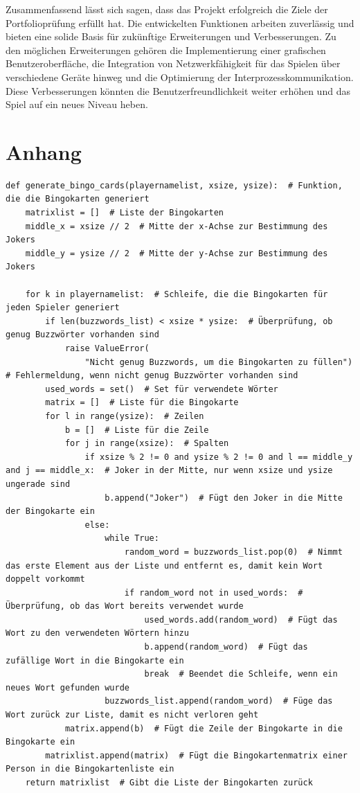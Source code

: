\documentclass{llncs}
\begin{document}
Zusammenfassend lässt sich sagen, dass das Projekt erfolgreich die Ziele der Portfolioprüfung erfüllt hat. Die entwickelten Funktionen arbeiten zuverlässig und bieten eine solide Basis für zukünftige Erweiterungen und Verbesserungen. Zu den möglichen Erweiterungen gehören die Implementierung einer grafischen Benutzeroberfläche, die Integration von Netzwerkfähigkeit für das Spielen über verschiedene Geräte hinweg und die Optimierung der Interprozesskommunikation. Diese Verbesserungen könnten die Benutzerfreundlichkeit weiter erhöhen und das Spiel auf ein neues Niveau heben.

\section{Anhang}

\begin{lstlisting}[caption=Generierung der Bingokarten]
    def generate_bingo_cards(playernamelist, xsize, ysize):  # Funktion, die die Bingokarten generiert
    matrixlist = []  # Liste der Bingokarten
    middle_x = xsize // 2  # Mitte der x-Achse zur Bestimmung des Jokers
    middle_y = ysize // 2  # Mitte der y-Achse zur Bestimmung des Jokers

    for k in playernamelist:  # Schleife, die die Bingokarten für jeden Spieler generiert
        if len(buzzwords_list) < xsize * ysize:  # Überprüfung, ob genug Buzzwörter vorhanden sind
            raise ValueError(
                "Nicht genug Buzzwords, um die Bingokarten zu füllen")  # Fehlermeldung, wenn nicht genug Buzzwörter vorhanden sind
        used_words = set()  # Set für verwendete Wörter
        matrix = []  # Liste für die Bingokarte
        for l in range(ysize):  # Zeilen
            b = []  # Liste für die Zeile
            for j in range(xsize):  # Spalten
                if xsize % 2 != 0 and ysize % 2 != 0 and l == middle_y and j == middle_x:  # Joker in der Mitte, nur wenn xsize und ysize ungerade sind
                    b.append("Joker")  # Fügt den Joker in die Mitte der Bingokarte ein
                else:
                    while True:
                        random_word = buzzwords_list.pop(0)  # Nimmt das erste Element aus der Liste und entfernt es, damit kein Wort doppelt vorkommt
                        if random_word not in used_words:  # Überprüfung, ob das Wort bereits verwendet wurde
                            used_words.add(random_word)  # Fügt das Wort zu den verwendeten Wörtern hinzu
                            b.append(random_word)  # Fügt das zufällige Wort in die Bingokarte ein
                            break  # Beendet die Schleife, wenn ein neues Wort gefunden wurde
                    buzzwords_list.append(random_word)  # Füge das Wort zurück zur Liste, damit es nicht verloren geht
            matrix.append(b)  # Fügt die Zeile der Bingokarte in die Bingokarte ein
        matrixlist.append(matrix)  # Fügt die Bingokartenmatrix einer Person in die Bingokartenliste ein
    return matrixlist  # Gibt die Liste der Bingokarten zurück

\end{lstlisting}
\end{document}
